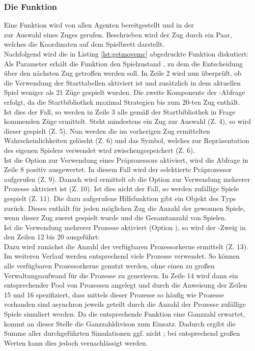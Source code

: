 \subsubsection{Die Funktion }
\label{mc-getmove}
Eine Funktion  wird von allen Agenten bereitgestellt und in der \\ zur Auswahl eines Zuges gerufen. Beschrieben wird der Zug durch ein Paar, welches die Koordinaten auf dem Spielbrett darstellt.
\\Nachfolgend wird die in Listing \ref{lst:getmovemc} abgedruckte Funktion diskutiert:
\vspace{0.5cm}
\\Als Parameter erhält die Funktion den Spielzustand , zu dem die Entscheidung über den nächsten Zug getroffen werden soll. In Zeile 2 wird nun überprüft, ob die Verwendung der Starttabellen aktiviert ist und zusätzlich in dem aktuellen Spiel weniger als 21 Züge gespielt wurden. Die zweite Komponente der -Abfrage erfolgt, da die Startbibliothek maximal Strategien bis zum 20-ten Zug enthält.
\\Ist dies der Fall, so werden in Zeile 3 alle gemäß der Startbibliothek in Frage kommenden Züge ermittelt. Steht mindestens ein Zug zur Auswahl (Z. 4), so wird dieser gespielt (Z. 5). Nun werden die im vorherigen Zug ermittelten Wahrscheinlichkeiten gelöscht (Z. 6) und das Symbol, welches zur Repräsentation des eigenen Spielers verwendet wird zwischengespeichert (Z. 6).
\\Ist die Option zur Verwendung eines Präprozessors aktiviert, wird die Abfrage in Zeile 8 positiv ausgewertet. In diesem Fall wird der selektierte Präprozessor aufgerufen (Z. 9). Danach wird ermittelt ob die Option zur Verwendung mehrerer Prozesse aktiviert ist (Z. 10). Ist dies nicht der Fall, so werden  zufällige Spiele gespielt (Z. 11). Die dazu aufgerufene Hilfsfunktion gibt ein Objekt des Typs  zurück. Dieses enthält für jeden möglichen Zug die Anzahl der gewonnen Spiele, wenn dieser Zug zuerst gespielt wurde und die Gesamtanzahl von Spielen.\\
Ist die Verwendung mehrerer Prozesse aktiviert (Option ), so wird der -Zweig in den Zeilen 12 bis 20 ausgeführt:
\\Dazu wird zunächst die Anzahl der verfügbaren Prozessorkerne ermittelt (Z. 13). Im weiteren Verlauf werden entsprechend viele Prozesse verwendet. So können alle verfügbaren Prozessorkerne genutzt werden, ohne einen zu großen Verwaltungsaufwand für die Prozesse zu generieren. In Zeile 14 wird dann ein entsprechender Pool von Prozessen angelegt und durch die Anweisung der Zeilen 15 und 16 spezifiziert, dass mittels dieser Prozesse so häufig wie Prozesse vorhanden sind asynchron jeweils  geteilt durch die Anzahl der Prozesse zufällige Spiele simuliert werden. Da die entsprechende Funktion eine Ganzzahl erwartet, kommt an dieser Stelle die Ganzzahldivison \code{//} zum Einsatz. Dadurch ergibt die Summe aller durchgeführten Simulationen ggf. nicht ; bei entsprechend großen Werten kann dies jedoch vernachlässigt werden.
